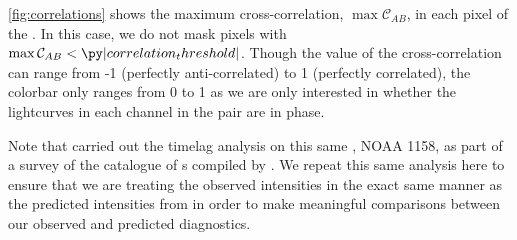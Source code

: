 \autoref{fig:correlations} shows the maximum cross-correlation, $\max\mathcal{C}_{AB}$, in each pixel of the \AR{}. In this case, we do not mask pixels with $\max\mathcal{C}_{AB}<\py|correlation_threshold|$. Though the value of the cross-correlation can range from -1 (perfectly anti-correlated) to 1 (perfectly correlated), the colorbar only ranges from 0 to 1 as we are only interested in whether the lightcurves in each channel in the pair are in phase. 

Note that \citet{viall_survey_2017} carried out the timelag analysis on this same \AR{}, NOAA 1158, as part of a survey of the catalogue of \AR{}s compiled by \citet{warren_systematic_2012}. We repeat this same analysis here to ensure that we are treating the observed intensities in the exact same manner as the predicted intensities from  in order to make meaningful comparisons between our observed and predicted diagnostics.

